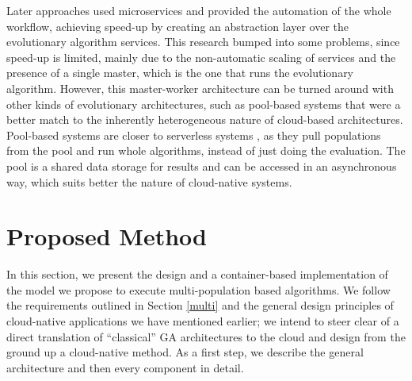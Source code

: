 \documentclass[review]{elsarticle}
\begin{document}
Later approaches used microservices \cite{khalloof2018generic} and 
provided the automation of the whole workflow\cite{salza2019speed}, 
achieving speed-up by creating an abstraction layer over the 
evolutionary algorithm services.
This research bumped into some problems, since speed-up is limited, mainly due to the
non-automatic scaling of services and the presence of a single
master, which is the one that runs the evolutionary
algorithm. However, this master-worker architecture can be turned
around with other kinds of evolutionary architectures, such
as pool-based systems
\cite{valenzuela2015implementing,merelo2012sofea,sofea:cec2012} that were 
a better match to the inherently heterogeneous nature of cloud-based
architectures. Pool-based systems are closer to serverless systems
\cite{malawski2017serverless}, as they pull populations from the pool and run
whole algorithms, instead of just doing the evaluation. The pool 
is a shared data storage for results and can be accessed in an
asynchronous way, which suits better the nature of cloud-native systems.

\section{Proposed Method} 
\label{method} 

In this section, we present the design
and a container-based implementation of the model we propose to execute
multi-population based algorithms. We follow the requirements outlined in
Section \ref{multi} and the general design principles of cloud-native
applications we have mentioned earlier; we intend to steer
clear of a direct translation of ``classical'' GA architectures to the
cloud and design from the ground up a cloud-native method. As a first step, we describe the general
architecture and then every component in detail. 
\end{document}

